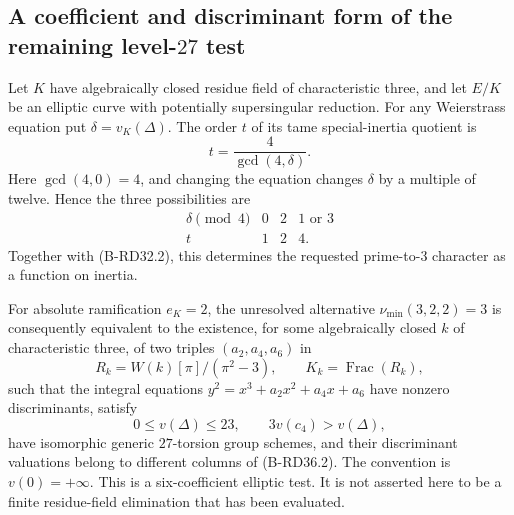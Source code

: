 \subsection{A coefficient and discriminant form of the remaining level-$27$ test}

\begin{proposition}
\label{prop:B-RD36}
Let $K$ have algebraically closed residue field of characteristic three,
and let $E/K$ be an elliptic curve with potentially supersingular
reduction. For any Weierstrass equation put
$\delta=v_K(\Delta)$. The order $t$ of its tame special-inertia
quotient is
\[
                  t=\frac4{\gcd(4,\delta)}.
                                                        \tag{B-RD36.1}
\]
Here $\gcd(4,0)=4$, and changing the equation changes $\delta$ by
a multiple of twelve. Hence the three possibilities are
\[
 \begin{array}{c|ccc}
 \delta\pmod4&0&2&1\text{ or }3\\ \hline
 t&1&2&4.
 \end{array}
                                                        \tag{B-RD36.2}
\]
Together with (B-RD32.2), this determines the requested
prime-to-$3$ character as a function on inertia.

For absolute ramification $e_K=2$, the unresolved alternative
$\nu_{\min}(3,2,2)=3$ is consequently equivalent to the existence,
for some algebraically closed $k$ of characteristic three, of two
triples $(a_2,a_4,a_6)$ in
\[
 R_k=W(k)[\pi]/(\pi^2-3),\qquad K_k=\operatorname{Frac}(R_k),
                                                        \tag{B-RD36.3}
\]
such that the integral equations
$y^2=x^3+a_2x^2+a_4x+a_6$ have nonzero discriminants, satisfy
\[
        0\leq v(\Delta)\leq23,\qquad
        3v(c_4)>v(\Delta),
                                                        \tag{B-RD36.4}
\]
have isomorphic generic $27$-torsion group schemes, and their
discriminant valuations belong to different columns of
(B-RD36.2). The convention is $v(0)=+\infty$.
This is a six-coefficient elliptic test. It is not asserted here
to be a finite residue-field elimination that has been evaluated.
\end{proposition}
